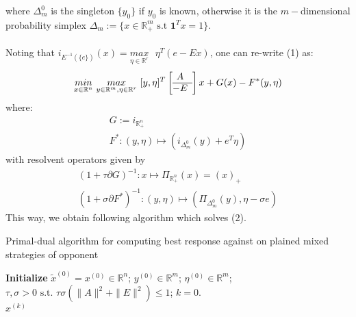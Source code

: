 \documentclass[a4paper,10pt,journal]{IEEEtran}
\begin{document}
where $\Delta_{m}^0$ is the singleton $\{y_0\}$ if $y_0$ is known, otherwise it is the $m-$dimensional probability simplex $\Delta_{m} := \{x \in \mathbb{R}_{+}^m \text{ s.t }\textbf{1}^Tx = 1\}$.\\\\
Noting that $i_{E^{-1}(\{e\})}(x) = \underset{\eta \in \mathbb{R}^r}{max}\text{ }\eta^T(e - Ex)$, one can re-write (1) as:
\begin{equation}
  \underset{x \in \mathbb{R}^n}{min}\text{ }\underset{y \in \mathbb{R}^m, \eta \in \mathbb{R}^r}{max}\text{ }[y,\eta]^T\left[ \begin{array}{@{}cc@{}}
    A \\ \hline
    -E
    \end{array} \right]x + G(x) - F^*(y, \eta)
\end{equation}
where:
\begin{equation}
  \begin{aligned}
    G:=i_{\mathbb{R}_{+}^n}\\
    F^*: (y, \eta) \mapsto (i_{\Delta_{m}^0}(y) + e^T\eta)
  \end{aligned}
\end{equation}
with resolvent operators given by
\begin{equation}
  \begin{aligned}
    (1 + \tau \partial G)^{-1}: x \mapsto \Pi_{\mathbb{R}_{+}^n}(x) = (x)_+\\
    (1 + \sigma \partial F^*)^{-1}: (y, \eta) \mapsto (\Pi_{\Delta_{m}^0}(y), \eta - \sigma e)%
  \end{aligned}
\end{equation}
This way, we obtain following algorithm which solves (2).

\begin{algorithm}[htb]
\caption{Primal-dual algorithm for computing best response against on plained mixed strategies of opponent}%
\textbf{Initialize} $\tilde{x}^{(0)} = x^{(0)} \in \mathbb{R}^n$; $y^{(0)} \in \mathbb{R}^{m}$; $\eta^{(0)} \in \mathbb{R}^{m}$;
$\tau, \sigma > 0 \text{ s.t. }\tau\sigma (\|A\|^2 + \|E\|^2) \le 1$; $k = 0$.\\
 \Return $x^{(k)}$
\label{Tab:pseudocode_lbfgs}
\end{algorithm}
\end{document}
